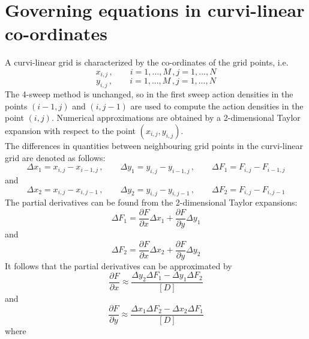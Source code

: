 \documentclass[12pt]{book}
\begin{document}
\section{Governing equations in curvi-linear co-ordinates} \label{sec:curvi}

A curvi-linear grid is characterized by the co-ordinates of the grid points, i.e.
\begin{equation}
  x_{i,j}\, , \qquad i=1,...,M \, , j=1,...,N
\end{equation}
\begin{equation}
  y_{i,j}\, , \qquad i=1,...,M \, , j=1,...,N
\end{equation}
The 4-sweep method is unchanged, so in the first sweep action densities in the points $(i-1,j)$ and $(i,j-1)$ are used to compute the action densities
in the point $(i,j)$. Numerical approximations are obtained by a 2-dimensional Taylor expansion with respect to the point $(x_{i,j},y_{i,j})$.
\\[2ex]
The differences in quantities between neighbouring grid points in the curvi-linear grid are denoted as follows:
\begin{equation}
  \Delta x_1 = x_{i,j} - x_{i-1,j} \, , \qquad \Delta y_1 = y_{i,j} - y_{i-1,j}\, , \qquad \Delta F_1 = F_{i,j} - F_{i-1,j}
\end{equation}
and
\begin{equation}
  \Delta x_2 = x_{i,j} - x_{i,j-1} \, , \qquad \Delta y_2 = y_{i,j} - y_{i,j-1}\, , \qquad \Delta F_2 = F_{i,j} - F_{i,j-1}
\end{equation}
The partial derivatives can be found from the 2-dimensional Taylor expansions:
\begin{equation}
  \Delta F_1 = \frac{\partial F}{\partial x} \Delta x_1 + \frac{\partial F}{\partial y} \Delta y_1
\end{equation}
and
\begin{equation}
  \Delta F_2 = \frac{\partial F}{\partial x} \Delta x_2 + \frac{\partial F}{\partial y} \Delta y_2
\end{equation}
It follows that the partial derivatives can be approximated by
\begin{equation}
  \frac{\partial F}{\partial x} \approx \frac{\Delta y_2 \Delta F_1 - \Delta y_1 \Delta F_2}{[D]}
\end{equation}
and
\begin{equation}
  \frac{\partial F}{\partial y} \approx \frac{\Delta x_1 \Delta F_2 - \Delta x_2 \Delta F_1}{[D]}
\end{equation}
where
\end{document}
